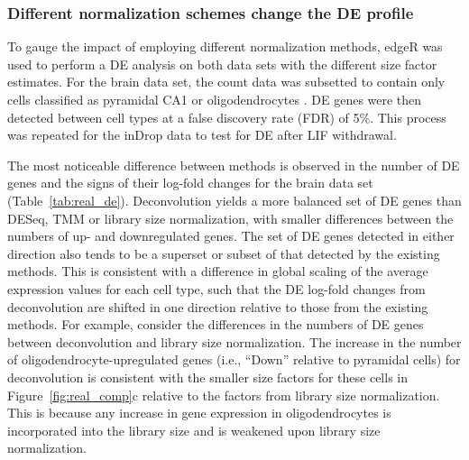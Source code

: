 \documentclass{bmcart}
\begin{document}
\subsubsection*{Different normalization schemes change the DE profile}
To gauge the impact of employing different normalization methods, edgeR was used to perform a DE analysis on both data sets with the different size factor estimates. 
For the brain data set, the count data was subsetted to contain only cells classified as pyramidal CA1 or oligodendrocytes \cite{zeisel2015brain}.
DE genes were then detected between cell types at a false discovery rate (FDR) of 5\%.
This process was repeated for the inDrop data to test for DE after LIF withdrawal.

The most noticeable difference between methods is observed in the number of DE genes and the signs of their log-fold changes for the brain data set (Table~\ref{tab:real_de}).
Deconvolution yields a more balanced set of DE genes than DESeq, TMM or library size normalization, with smaller differences between the numbers of up- and downregulated genes.
The set of DE genes detected in either direction also tends to be a superset or subset of that detected by the existing methods.
This is consistent with a difference in global scaling of the average expression values for each cell type, 
    such that the DE log-fold changes from deconvolution are shifted in one direction relative to those from the existing methods.
For example, consider the differences in the numbers of DE genes between deconvolution and library size normalization.
The increase in the number of oligodendrocyte-upregulated genes (i.e., ``Down'' relative to pyramidal cells) for deconvolution is consistent with the smaller size factors for these cells in Figure~\ref{fig:real_comp}c relative to the factors from library size normalization.
This is because any increase in gene expression in oligodendrocytes is incorporated into the library size and is weakened upon library size normalization.
\end{document}
